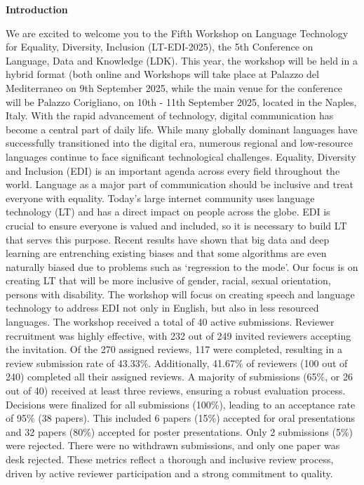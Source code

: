 \documentclass[11pt,oneside]{book}
\begin{document}
  \begin{center}
   { \Large \textbf{Introduction}}
  \end{center}
  \vspace*{0.5cm}
  We are excited to welcome you to the Fifth Workshop on Language Technology for Equality, Diversity, Inclusion (LT-EDI-2025), the 5th Conference on Language, Data and Knowledge (LDK). This year, the workshop will be held in a hybrid format (both online and Workshops will take place at Palazzo del Mediterraneo on 9th September 2025, while the main venue for the conference will be Palazzo Corigliano, on 10th - 11th September 2025, located in the Naples, Italy. With the rapid advancement of technology, digital communication has become a central part of daily life. While many globally dominant languages have successfully transitioned into the digital era, numerous regional and low-resource languages continue to face significant technological challenges. Equality, Diversity and Inclusion (EDI) is an important agenda across every field throughout the world. Language as a major part of communication should be inclusive and treat everyone with equality. Today’s large internet community uses language technology (LT) and has a direct impact on people across the globe. EDI is crucial to ensure everyone is valued and included, so it is necessary to build LT that serves this purpose. Recent results have shown that big data and deep learning are entrenching existing biases and that some algorithms are even naturally biased due to problems such as ‘regression to the mode’. Our focus is on creating LT that will be more inclusive of gender, racial, sexual orientation, persons with disability. The workshop will focus on creating speech and language technology to address EDI not only in English, but also in less resourced languages. The workshop received a total of 40 active submissions. Reviewer recruitment was highly effective, with 232 out of 249 invited reviewers accepting the invitation. Of the 270 assigned reviews, 117 were completed, resulting in a review submission rate of 43.33\%. Additionally, 41.67\% of reviewers (100 out of 240) completed all their assigned reviews. A majority of submissions (65\%, or 26 out of 40) received at least three reviews, ensuring a robust evaluation process. Decisions were finalized for all submissions (100\%), leading to an acceptance rate of 95\% (38 papers). This included 6 papers (15\%) accepted for oral presentations and 32 papers (80\%) accepted for poster presentations. Only 2 submissions (5\%) were rejected. There were no withdrawn submissions, and only one paper was desk rejected. These metrics reflect a thorough and inclusive review process, driven by active reviewer participation and a strong commitment to quality.
  \newpage
\end{document}
